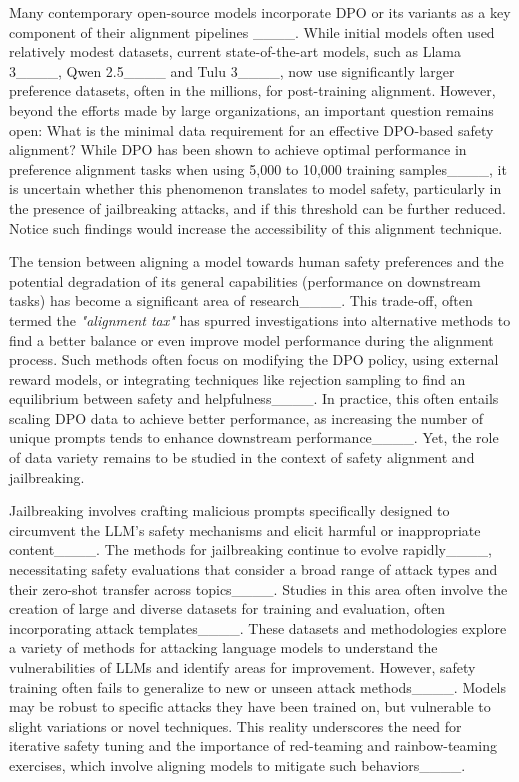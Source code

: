 Many contemporary open-source models incorporate DPO or its variants as a key component of their alignment pipelines ____. While initial models often used relatively modest datasets, current state-of-the-art models, such as Llama 3____, Qwen 2.5____ and Tulu 3____, now use significantly larger preference datasets, often in the millions, for post-training alignment. However, beyond the efforts made by large organizations, an important question remains open: What is the minimal data requirement for an effective DPO-based safety alignment? While DPO has been shown to achieve optimal performance in preference alignment tasks when using 5,000 to 10,000 training samples____, it is uncertain whether this phenomenon translates to model safety, particularly in the presence of jailbreaking attacks, and if this threshold can be further reduced. Notice such findings would increase the accessibility of this alignment technique.

The tension between aligning a model towards human safety preferences and the potential degradation of its general capabilities (\ie performance on downstream tasks) has become a significant area of research____. This trade-off, often termed the \textit{"alignment tax"} has spurred investigations into alternative methods to find a better balance or even improve model performance during the alignment process. Such methods often focus on modifying the DPO policy, using external reward models, or integrating techniques like rejection sampling to find an equilibrium between safety and helpfulness____. In practice, this often entails scaling DPO data to achieve better performance, as increasing the number of unique prompts tends to enhance downstream performance____. Yet, the role of data variety remains to be studied in the context of safety alignment and jailbreaking.

Jailbreaking involves crafting malicious prompts specifically designed to circumvent the LLM’s safety mechanisms and elicit harmful or inappropriate content____. The methods for jailbreaking continue to evolve rapidly____, necessitating safety evaluations that consider a broad range of attack types and their zero-shot transfer across topics____. Studies in this area often involve the creation of large and diverse datasets for training and evaluation, often incorporating attack templates____. These datasets and methodologies explore a variety of methods for attacking language models to understand the vulnerabilities of LLMs and identify areas for improvement. However, safety training often fails to generalize to new or unseen attack methods____. Models may be robust to specific attacks they have been trained on, but vulnerable to slight variations or novel techniques. This reality underscores the need for iterative safety tuning and the importance of red-teaming and rainbow-teaming exercises, which involve aligning models to mitigate such behaviors____. 

